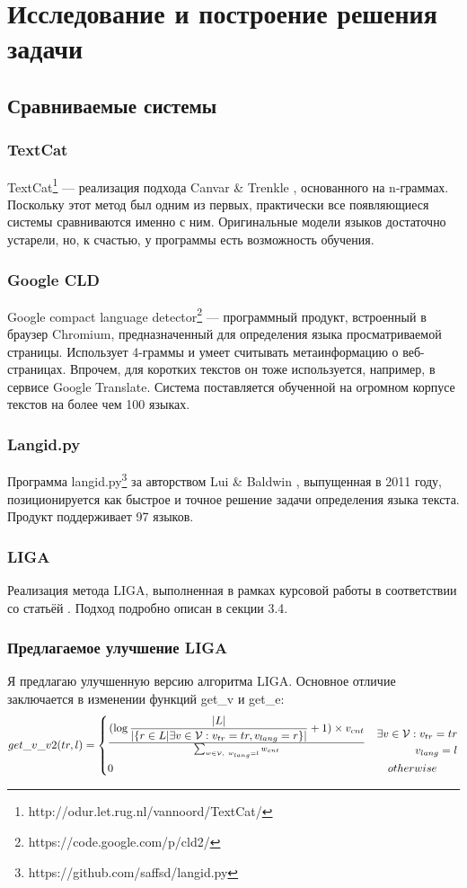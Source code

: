\documentclass[a4paper, 14pt]{article}
\begin{document}
\section{Исследование и построение решения задачи}
		\subsection{Сравниваемые системы}
			\subsubsection{TextCat}
			TextCat\footnote{http://odur.let.rug.nl/vannoord/TextCat/} --- реализация подхода Canvar \& Trenkle \cite{canvar}, основанного на n-граммах.
			Поскольку этот метод был одним из первых, практически все появляющиеся системы сравниваются именно
			с ним. 
			Оригинальные модели языков достаточно устарели, но, к счастью, у программы есть возможность обучения.
			\subsubsection{Google CLD}
			Google compact language detector\footnote{https://code.google.com/p/cld2/} --- программный продукт, встроенный в браузер Chromium, 
			предназначенный для определения языка просматриваемой страницы. 
			Использует 4-граммы и умеет считывать метаинформацию
			о веб-страницах. Впрочем, для коротких текстов он тоже используется, например, в сервисе Google Translate. Система поставляется обученной
			на огромном корпусе текстов на более чем 100 языках.
			\subsubsection{Langid.py}
			Программа langid.py\footnote{https://github.com/saffsd/langid.py} за авторством Lui \& Baldwin \cite{langid}, выпущенная в 2011 году, позиционируется
			как быстрое и точное решение задачи определения языка текста. Продукт поддерживает 97 языков.
			\subsubsection{LIGA}
			Реализация метода LIGA, выполненная в рамках курсовой работы в соответствии со статьёй \cite{liga}. Подход подробно описан в секции 3.4.
			\subsubsection{Предлагаемое улучшение LIGA}
			Я предлагаю улучшенную версию алгоритма LIGA. Основное отличие заключается в изменении функций get\_v и get\_e:
			\[
 			get\_v\_v2(tr, l) =
 			  \begin{dcases}
  			   {(\log{|L| \over |\{r \in L | \exists v \in \mathcal{V}: v_{tr}=tr, v_{lang}=r\}|} + 1) \times  v_{cnt}} \over 
  			   \sum_{w \in \mathcal{V},\ w_{lang}=l} w_{cnt} & 
  			   \begin{split} 
						 \exists v \in \mathcal{V}: v_{tr}=tr \\ v_{lang}=l	
  			   	\end{split} \\
  			   0 & \quad otherwise
  			 \end{dcases}
			\]		
		
\end{document}
